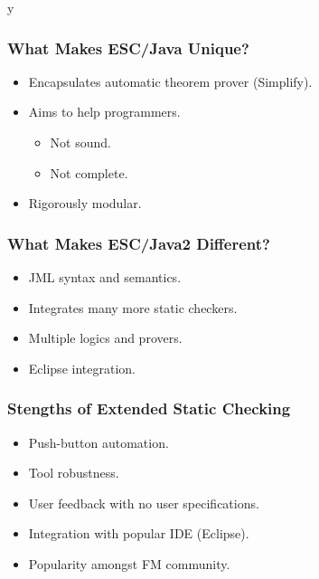 \if y\MAKEHANDOUTS \documentclass[t,compress,landscape,handout]{beamer}
\begin{document}
\begin{frame}
\frametitle{What Makes ESC/Java Unique?}

\begin{itemize}
\item
Encapsulates automatic theorem prover (Simplify).

\item
Aims to help programmers.
\begin{itemize}
\item
Not sound.

\item
Not complete.
\end{itemize}

\item
Rigorously modular.
\end{itemize}
\end{frame}

\begin{frame}
\frametitle{What Makes ESC/Java2 Different?}
\begin{itemize}
\item
JML syntax and semantics.

\item
Integrates many more static checkers.

\item
Multiple logics and provers.

\item
Eclipse integration.
\end{itemize}
\end{frame}

\begin{frame}
\frametitle{Stengths of Extended Static Checking}
\begin{itemize}
\item
Push-button automation.

\item
Tool robustness.

\item
User feedback with no user specifications.

\item
Integration with popular IDE (Eclipse).

\item
Popularity amongst FM community.
\end{itemize}
\end{frame}
\end{document}
